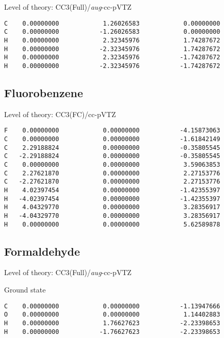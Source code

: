 \documentclass[journal=jctcce,manuscript=article,layout=traditional]{achemso}
\newcommand{\TZ}{cc-pVTZ}
\newcommand{\AVTZ}{\emph{aug}-cc-pVTZ}
\begin{document}
\begin{singlespace}
Level of theory: CC3(Full)/{\AVTZ}
\begin{verbatim}
C    0.00000000            1.26026583            0.00000000
C    0.00000000           -1.26026583            0.00000000
H    0.00000000            2.32345976            1.74287672
H    0.00000000           -2.32345976            1.74287672
H    0.00000000            2.32345976           -1.74287672
H    0.00000000           -2.32345976           -1.74287672
\end{verbatim}
\end{singlespace}


\subsection*{Fluorobenzene}

\begin{singlespace}
Level of theory: CC3(FC)/{\TZ}
\begin{verbatim}
F    0.00000000            0.00000000           -4.15873063
C    0.00000000            0.00000000           -1.61842149
C    2.29188824            0.00000000           -0.35805545
C   -2.29188824            0.00000000           -0.35805545
C    0.00000000            0.00000000            3.59063853
C    2.27621870            0.00000000            2.27153776
C   -2.27621870            0.00000000            2.27153776
H    4.02397454            0.00000000           -1.42355397
H   -4.02397454            0.00000000           -1.42355397
H    4.04329770            0.00000000            3.28356917
H   -4.04329770            0.00000000            3.28356917
H    0.00000000            0.00000000            5.62589878
\end{verbatim}
\end{singlespace}

\subsection*{Formaldehyde}

\begin{singlespace}
Level of theory: CC3(Full)/{\AVTZ}
\end{singlespace}

\begin{singlespace}
\noindent Ground state
\begin{verbatim}
C    0.00000000            0.00000000           -1.13947666
O    0.00000000            0.00000000            1.14402883
H    0.00000000            1.76627623           -2.23398653
H    0.00000000           -1.76627623           -2.23398653
\end{verbatim}
\end{singlespace}
\end{document}

